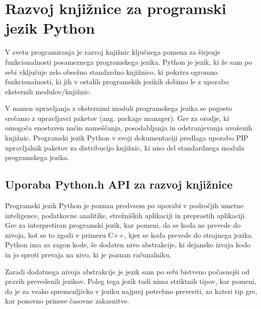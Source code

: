 \documentclass[a4paper,12pt,openright]{book}
\begin{document}
    \section{Razvoj knjižnice za programski jezik \newline Python}

    V svetu programiranja je razvoj knjižnic ključnega pomena za širjenje funkcionalnosti posameznega programskega jezika. Python je jezik, ki že sam po sebi vključuje zelo obsežno standardno knjižnico, ki pokriva ogromno funkcionalnosti, ki jih v ostalih programskih jezikih dobimo le z uporabo eksternih modulov/knjižnic.

    V namen upravljanja z eksternimi moduli programskega jezika se pogosto srečamo z upravljavci paketov (ang. package manager). Gre za orodje, ki omogoča enostaven način nameščanja, posodabljanja in odstranjevanja uvoženih knjižnic. Programski jezik Python v svoji dokumentaciji \cite{PY_PM} predlaga uporabo PIP upravljalnik paketov za distribucijo knjižnic, ki niso del standardnega modula programskega jezika.
   
    \subsection{Uporaba Python.h API za razvoj knjižnice}
   Programski jezik Python je poznan predvsem po uporabi v področjih umetne inteligence, podatkovne analitike, strežniških aplikaciji in preprostih aplikaciji. Gre za interpretiran programski jezik, kar pomeni, da se koda ne prevede do nivoja, kot se to zgodi v primeru C++, kjer se koda prevede do strojnega jezika. Python ima za zagon kode, še dodaten nivo abstrakcije, ki dejansko izvaja kodo in jo sproti prevaja na nivo, ki je poznan računalniku.

   Zaradi dodatnega nivoja abstrakcije je jezik sam po sebi bistveno počasnejši od pravih prevedenih jezikov. Poleg tega jezik tudi nima striktnih tipov, kar pomeni, da je za vsako spremenljivko v jeziku najprej potrebno preveriti, za kateri tip gre, kar ponovno prinese časovne zakasnitve.
\end{document}
